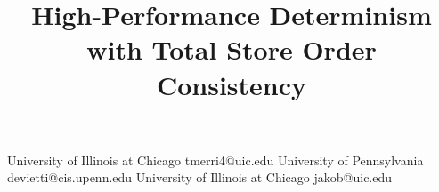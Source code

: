 \documentclass[10pt]{sigplanconf}
\begin{document}



\exclusivelicense                %



\title{High-Performance Determinism with Total Store Order Consistency}

           {University of Illinois at Chicago}
           {tmerri4@uic.edu}
           {University of Pennsylvania}
           {devietti@cis.upenn.edu}
           {University of Illinois at Chicago}
           {jakob@uic.edu}


\maketitle

\newcommand{\checkout}{{\tt checkout()}}
\newcommand{\settled}{{\tt commit()}}
\newcommand{\settledm}{{\tt commit\_mutex()}}
\newcommand{\update}{{\tt update()}}
\newcommand{\updatem}{{\tt update\_mutex()}}
\newcommand{\commit}{{\tt commit()}}
\newcommand{\commitm}{{\tt commit\_mutex()}}
\newcommand{\mksnap}{{\tt commit()}}
\newcommand{\getsnap}{{\tt update()}}
\newcommand{\fork}{{\tt fork}}
\newcommand{\pte}{{\tt pte}}
\newcommand{\determEnd}{{\tt determ\_end}}
\newcommand{\pthread}{{\tt pthread}}


\newcommand{\create}{{\tt pthread\_create}}
\newcommand{\dthreads}{Dthreads}
\end{document}
